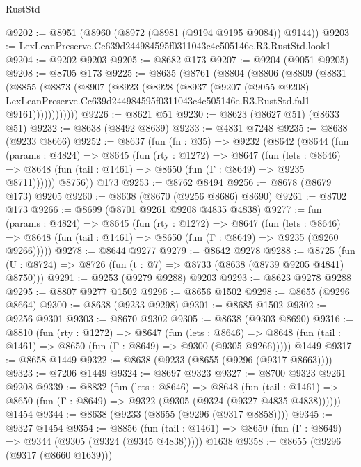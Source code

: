 \begin{lexlean}{RustStd}
\begin{coremodule}
@9202 := @8951 (@8960 (@8972 (@8981 (@9194 @9195 @9084)) @9144))
@9203 := LexLeanPreserve.Cc639d244984595f0311043c4c505146e.R3.RustStd.look1
@9204 := @9202 @9203
@9205 := @8682 @173
@9207 := @9204 (@9051 @9205)
@9208 := @8705 @173
@9225 := @8635
    (@8761
      (@8804
        (@8806
          (@8809
            (@8831
              (@8855
                (@8873
                  (@8907
                    (@8923
                      (@8928
                        (@8937
                          (@9207
                            (@9055 @9208)
                            LexLeanPreserve.Cc639d244984595f0311043c4c505146e.R3.RustStd.fal1
                            @9161))))))))))))
@9226 := @8621 @51
@9230 := @8623 (@8627 @51) (@8633 @51)
@9232 := @8638 (@8492 @8639)
@9233 := @4831 @7248
@9235 := @8638 (@9233 @8666)
@9252 := @8637
    (fun (fn : @35) =>
    @9232
      (@8642
        (@8644
          (fun (params : @4824) =>
          @8645
            (fun (rty : @1272) =>
            @8647
              (fun (lets : @8646) =>
              @8648 (fun (tail : @1461) => @8650 (fun (Γ : @8649) => @9235 @8711))))))
        @8756))
    @173
@9253 := @8762 @8494
@9256 := @8678 (@8679 @173) @9205
@9260 := @8638 (@8670 (@9256 @8686) @8690)
@9261 := @8702 @173
@9266 := @8699 (@8701 @9261 @9208 @4835 @4838)
@9277 := fun (params : @4824) =>
  @8645
    (fun (rty : @1272) =>
    @8647
      (fun (lets : @8646) =>
      @8648 (fun (tail : @1461) => @8650 (fun (Γ : @8649) => @9235 (@9260 @9266)))))
@9278 := @8644 @9277
@9279 := @8642 @9278
@9288 := @8725 (fun (U : @8724) => @8726 (fun (t : @7) => @8733 (@8638 (@8739 @9205 @4841) @8750)))
@9291 := @9253 (@9279 @9288) @9203
@9293 := @8623 @9278 @9288
@9295 := @8807 @9277 @1502
@9296 := @8656 @1502
@9298 := @8655 (@9296 @8664)
@9300 := @8638 (@9233 @9298)
@9301 := @8685 @1502
@9302 := @9256 @9301
@9303 := @8670 @9302
@9305 := @8638 (@9303 @8690)
@9316 := @8810
    (fun (rty : @1272) =>
    @8647
      (fun (lets : @8646) =>
      @8648 (fun (tail : @1461) => @8650 (fun (Γ : @8649) => @9300 (@9305 @9266)))))
    @1449
@9317 := @8658 @1449
@9322 := @8638 (@9233 (@8655 (@9296 (@9317 @8663))))
@9323 := @7206 @1449
@9324 := @8697 @9323
@9327 := @8700 @9323 @9261 @9208
@9339 := @8832
    (fun (lets : @8646) =>
    @8648
      (fun (tail : @1461) => @8650 (fun (Γ : @8649) => @9322 (@9305 (@9324 (@9327 @4835 @4838))))))
    @1454
@9344 := @8638 (@9233 (@8655 (@9296 (@9317 @8858))))
@9345 := @9327 @1454
@9354 := @8856
    (fun (tail : @1461) => @8650 (fun (Γ : @8649) => @9344 (@9305 (@9324 (@9345 @4838)))))
    @1638
@9358 := @8655 (@9296 (@9317 (@8660 @1639)))

\end{coremodule}
\end{lexlean}
